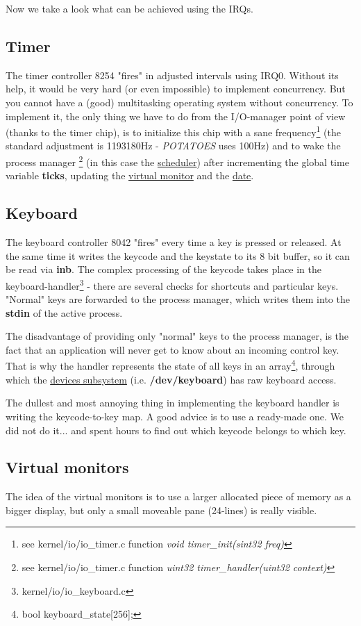 \documentclass[11pt,a4paper]{scrartcl}
\begin{document}
Now we take a look what can be achieved using the IRQs.
\subsection{Timer}
\hypertarget{TIMER}{}
The timer controller 8254 "fires" in adjusted intervals using IRQ0. Without its help, it would be very hard (or even impossible) to implement concurrency. But you cannot have a (good) multitasking operating system without concurrency. To implement it, the only thing we have to do from the I/O-manager point of view (thanks to the timer chip), is to initialize this chip with a sane frequency\footnote{see {kernel/io/io\_timer.c} function \textit{void timer\_init(sint32 freq)}} (the standard adjustment is 1193180Hz - \textit{POTATOES} uses 100Hz) and to wake the process manager \footnote{see {kernel/io/io\_timer.c} function \textit{uint32 timer\_handler(uint32 context)}} (in this case the \hyperlink{SCHEDULER}{scheduler}) after incrementing the global time variable \textbf{ticks}, updating the \hyperlink{VMONITOR}{virtual monitor} and the \hyperlink{RTC}{date}.

\subsection{Keyboard}
\hypertarget{KEYBOARD}{}
The keyboard controller 8042 "fires" every time a key is pressed or released. At the same time it writes the keycode and the keystate to its 8 bit buffer, so it can be read via \textbf{inb}. The complex processing of the keycode takes place in the keyboard-handler\footnote{kernel/io/io\_keyboard.c} - there are several checks for shortcuts and particular keys. "Normal" keys are forwarded to the process manager, which writes them into the \textbf{stdin} of the active process.

The disadvantage of providing only "normal" keys to the process manager, is the fact that an application will never get to know about an incoming control key. That is why the handler represents the state of all keys in an array\footnote{bool keyboard\_state[256];}, through which the \hyperlink{DEVICES}{devices subsystem} (i.e. \textbf{/dev/keyboard}) has raw keyboard access.

The dullest and most annoying thing in implementing the keyboard handler is writing the keycode-to-key map. A good advice is to use a ready-made one. We did not do it... and spent hours to find out which keycode belongs to which key.
\subsection{Virtual monitors}
\hypertarget{VMONITOR}{}
The idea of the virtual monitors is to use a larger allocated piece of memory as a bigger display, but only a small moveable pane (24-lines) is really visible.
\end{document}

